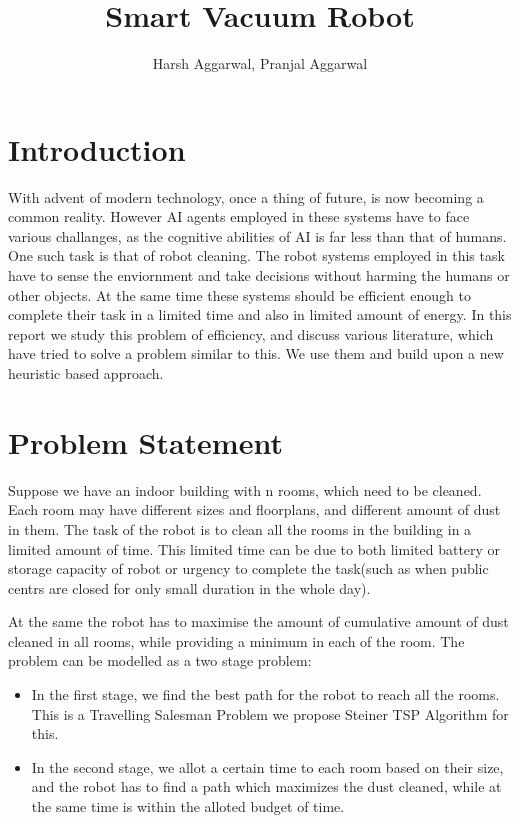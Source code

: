 \documentclass{article}
\title{Smart Vacuum Robot}
\author{Harsh Aggarwal, Pranjal Aggarwal}
\date{}
\begin{document}
\maketitle

\section{Introduction}

With advent of modern technology, once a thing of future, is now becoming a common reality. However AI agents employed
in these systems have to face various challanges, as the cognitive abilities of AI is far less than that of humans. 
One such task is that of robot cleaning. The robot systems employed in this task have to sense the enviornment
and take decisions without harming the humans or other objects. At the same time these systems should be efficient enough to complete their task in
a limited time and also in limited amount of energy. In this report we study this problem of efficiency, and discuss various literature, which have tried to solve a problem similar to this.
We use them and build upon a new heuristic based approach.

\section{Problem Statement}

Suppose we have an indoor building with n rooms, which need to be cleaned. Each room may have different sizes
and floorplans, and different amount of dust in them. The task of the robot is to clean all the rooms in the building in a limited amount of time.
This limited time can be due to both limited battery or storage capacity of robot or urgency to complete the task(such as when public centrs are closed for only small duration in the whole day).

At the same the robot has to maximise the amount of cumulative amount of dust cleaned in all rooms, while providing a minimum in each of the room.
The problem can be modelled as a two stage problem:
\begin{itemize}
    \item In the first stage, we find the best path for the robot to reach all the rooms. This is a Travelling Salesman Problem we propose Steiner TSP Algorithm for this.
    \item In the second stage, we allot a certain time to each room based on their size, and the robot has to find a path which maximizes the dust cleaned, while at the same time is within the alloted budget of time.
\end{itemize}
\end{document}
